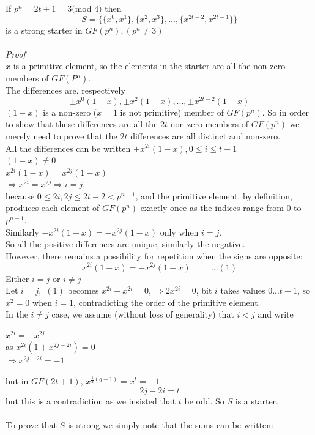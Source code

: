 \documentclass[
  12pt,
  a4paper]{book}
\begin{document}
If \(p^n=2t+1=3(\)mod \(4)\) then
\[S=\{\{x^0,x^1\},\{x^2,x^3\},...,\{x^{2t-2},x^{2t-1}\}\}\] is a strong
starter in \(GF(p^n),(p^n \neq 3)\)\\
~\\
\emph{Proof}\\
\(x\) is a primitive element, so the elements in the starter are all the
non-zero members of \(GF(P^n)\).\\
The differences are, respectively
\[\pm x^0(1-x), \pm x^2 (1-x), ... , \pm x^{2t-2}(1-x)\] \((1-x)\) is a
non-zero (\(x=1\) is not primitive) member of \(GF(p^n)\). So in order
to show that these differences are all the \(2t\) non-zero members of
\(GF(p^n)\) we merely need to prove that the \(2t\) differences are all
distinct and non-zero.\\
All the differences can be written
\(\pm x^{2i}(1-x), 0 \leq i \leq t-1\)\\
\((1-x) \neq 0\)\\
\(x^{2i}(1-x)=x^{2j}(1-x)\)\\
\(\Rightarrow x^{2i}=x^{2j} \Rightarrow i=j\),\\
because \(0 \leq 2i,2j \leq 2t-2 < p^{n-1}\), and the primitive element,
by definition, produces each element of \(GF(p^n)\) exactly once as the
indices range from 0 to \(p^{n-1}\).\\
Similarly \(-x^{2i}(1-x)=-x^{2j}(1-x)\) only when \(i=j\).\\
So all the positive differences are unique, similarly the negative.\\
However, there remains a possibility for repetition when the signs are
opposite: \[x^{2i}(1-x)=-x^{2j}(1-x) \hspace{1cm}...(1)\] Either \(i=j\)
or \(i \neq j\)\\
Let \(i=j,\) \((1)\) becomes \(x^{2i}+x^{2i}=0, \Rightarrow 2x^{2i}=0\),
bit \(i\) takes values \(0...t-1\), so \(x^2=0\) when \(i=1\),
contradicting the order of the primitive element.\\
In the \(i \neq j\) case, we assume (without loss of generality) that
\(i<j\) and write

\(x^{2i} = -x^{2j}\)\\
as \(x^{2i}(1+x^{2j-2i})=0\)\\
\(\Rightarrow x^{2j-2i}=-1\)

but in \(GF(2t+1)\), \(x^{\frac{1}{2}(q-1)}=x^t=-1\) \[2j-2i=t\] but
this is a contradiction as we insisted that \(t\) be odd. So \(S\) is a
starter.\\
~\\
To prove that \(S\) is strong we simply note that the sums can be
written:
\end{document}
